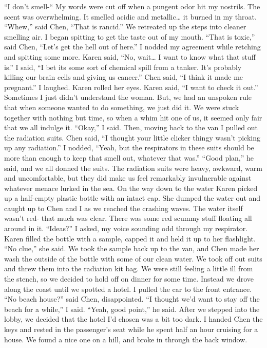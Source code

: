 \documentclass[a4paper]{article}
\begin{document}
“I don’t smell-“ My words were cut off when a pungent odor hit my nostrils. The scent was overwhelming. It smelled acidic and metallic… it burned in my throat.
“Whew,” said Chen, “That is rancid.”
We retreated up the steps into cleaner smelling air. I began spitting to get the taste out of my mouth.
“That is toxic,” said Chen, “Let’s get the hell out of here.”
I nodded my agreement while retching and spitting some more.
Karen said, “No, wait… I want to know what that stuff is.”
I said, “I bet its some sort of chemical spill from a tanker. It’s probably killing our brain cells and giving us cancer.”
Chen said, “I think it made me pregnant.”
I laughed. Karen rolled her eyes.
Karen said, “I want to check it out.”
Sometimes I just didn’t understand the woman. But, we had an unspoken rule that when someone wanted to do something, we just did it. We were stuck together with nothing but time, so when a whim hit one of us, it seemed only fair that we all indulge it.
“Okay,” I said. Then, moving back to the van I pulled out the radiation suits.
Chen said, “I thought your little clicker thingy wasn't picking up any radiation.”
I nodded, “Yeah, but the respirators in these suits should be more than enough to keep that smell out, whatever that was.”
“Good plan,” he said, and we all donned the suits.
The radiation suits were heavy, awkward, warm and uncomfortable, but they did make us feel remarkably invulnerable against whatever menace lurked in the sea. On the way down to the water Karen picked up a half-empty plastic bottle with an intact cap. She dumped the water out and caught up to Chen and I as we reached the crashing waves.
The water itself wasn’t red- that much was clear. There was some red scummy stuff floating all around in it. “Ideas?” I asked, my voice sounding odd through my respirator.
Karen filled the bottle with a sample, capped it and held it up to her flashlight. “No clue,” she said.
We took the sample back up to the van, and Chen made her wash the outside of the bottle with some of our clean water. We took off out suits and threw them into the radiation kit bag.
We were still feeling a little ill from the stench, so we decided to hold off on dinner for some time. Instead we drove along the coast until we spotted a hotel. I pulled the car to the front entrance.
“No beach house?” said Chen, disappointed.
“I thought we’d want to stay off the beach for a while,” I said.
“Yeah, good point,” he said.
After we stepped into the lobby, we decided that the hotel I’d chosen was a bit too dark. I handed Chen the keys and rested in the passenger’s seat while he spent half an hour cruising for a house. We found a nice one on a hill, and broke in through the back window.
\end{document}
